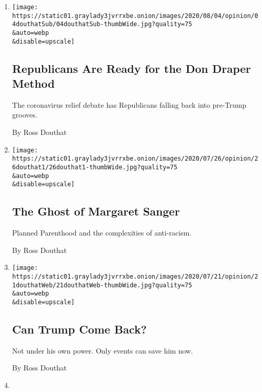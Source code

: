 \begin{enumerate}
\def\labelenumi{\arabic{enumi}.}
\item
  \href{/2020/08/04/opinion/trump-republicans-tea-party.html}{}

  \texttt{[image: https://static01.graylady3jvrrxbe.onion/images/2020/08/04/opinion/04douthatSub/04douthatSub-thumbWide.jpg?quality=75\\\&auto=webp\\\&disable=upscale]}

  \hypertarget{republicans-are-ready-for-the-don-draper-method}{%
  \subsection{Republicans Are Ready for the Don Draper
  Method}\label{republicans-are-ready-for-the-don-draper-method}}

  The coronavirus relief debate has Republicans falling back into
  pre-Trump grooves.

  By Ross Douthat
\item
  \href{/2020/07/25/opinion/sunday/abortion-racism-margaret-sanger.html}{}

  \texttt{[image: https://static01.graylady3jvrrxbe.onion/images/2020/07/26/opinion/26douthat1/26douthat1-thumbWide.jpg?quality=75\\\&auto=webp\\\&disable=upscale]}

  \hypertarget{the-ghost-of-margaret-sanger}{%
  \subsection{The Ghost of Margaret
  Sanger}\label{the-ghost-of-margaret-sanger}}

  Planned Parenthood and the complexities of anti-racism.

  By Ross Douthat
\item
  \href{/2020/07/21/opinion/trump-polls-election-2020.html}{}

  \texttt{[image: https://static01.graylady3jvrrxbe.onion/images/2020/07/21/opinion/21douthatWeb/21douthatWeb-thumbWide.jpg?quality=75\\\&auto=webp\\\&disable=upscale]}

  \hypertarget{can-trump-come-back}{%
  \subsection{Can Trump Come Back?}\label{can-trump-come-back}}

  Not under his own power. Only events can save him now.

  By Ross Douthat
\item
  \href{/2020/07/18/opinion/sunday/white-fragility-meritocracy.html}{}


\end{enumerate}
